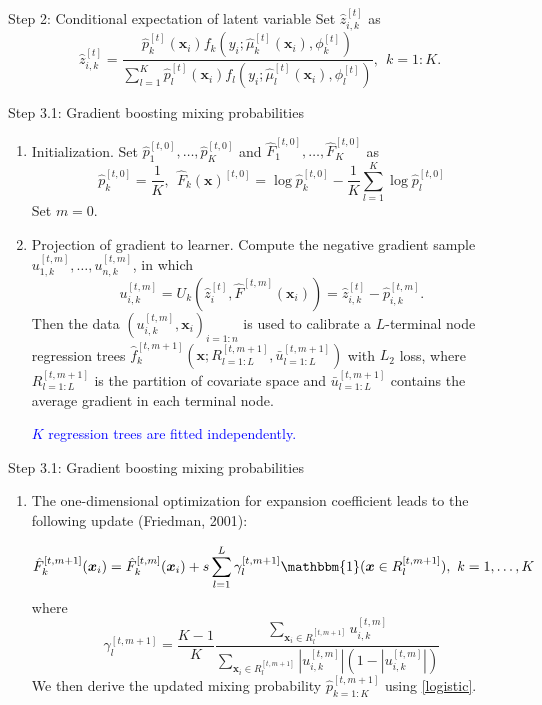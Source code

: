 \documentclass[professionalfont]{beamer}
\newcounter{saveenumi}
\newcommand{\seti}{\setcounter{saveenumi}{\value{enumi}}}
\newcommand{\conti}{\setcounter{enumi}{\value{saveenumi}}}
\def\bx{\boldsymbol{x}}
\newcommand{\blue}[1]{\textcolor{blue}{#1}}
\begin{document}
\begin{frame}{Step 2: Conditional expectation of latent variable}
	Set $\hat{z}_{i,k}^{[t]}$ as
	\begin{equation*}
		\hat{z}_{i,k}^{[t]}=\frac{\hat{p}_{k}^{[t]}(\bx_i) f_{k}\left(y_i ; \hat{\mu}_{k}^{[t]}(\bx_i), \phi_k^{[t]} \right)}{\sum_{l=1}^{K} \hat{p}_{l}^{[t]}(\bx_i) f_{l}\left(y_i ; \hat{\mu}_{l}^{[t]}(\bx_i), \phi_l^{[t]}\right)},~~ k=1:K.
	\end{equation*}
\end{frame}

\begin{frame}{Step 3.1: Gradient boosting mixing probabilities}
	\begin{enumerate}
		\item Initialization. Set $\hat{p}_1^{[t,0]}, \ldots, \hat{p}_K^{[t,0]}$ and $\hat{F}_1^{[t,0]}, \ldots, \hat{F}_{K}^{[t,0]}$ as
		$$\hat{p}_k^{[t,0]}=\frac{1}{K},
		~~\hat{F}_k(\bx)^{[t,0]}=\log \hat{p}_k^{[t,0]}-\frac{1}{K}\sum_{l=1}^K\log \hat{p}_l^{[t,0]}$$
	Set $m=0$.
		\item Projection of gradient to learner.
		Compute the negative gradient sample $u_{1,k}^{[t,m]},\ldots,u_{n,k}^{[t,m]}$,  in which
		$$u_{i,k}^{[t,m]}=U_k(\hat{z}_{i}^{[t]},\hat{F}^{[t,m]}(\bx_i))=\hat{z}_{i,k}^{[t]}-\hat{p}_{i,k}^{[t,m]}.$$
		Then the data $(u_{i,k}^{[t,m]},\bx_i)_{i=1:n}$ is used to calibrate a $L$-terminal node regression trees $\hat{f}_k^{[t,m+1]}\left(\bx;R^{[t,m+1]}_{l=1:L},\bar{u}^{[t,m+1]}_{l=1:L}\right)$ with $L_2$ loss,
		where $R^{[t,m+1]}_{l=1:L}$ is the partition of covariate space and $\bar{u}^{[t,m+1]}_{l=1:L}$ contains the average gradient in each terminal node.

		\blue{$K$ regression trees are fitted independently.}
		\seti
	\end{enumerate}
\end{frame}

\begin{frame}{Step 3.1: Gradient boosting mixing probabilities}
	\begin{enumerate}
		\conti
		\item  The one-dimensional optimization for expansion coefficient leads to the following update (Friedman, 2001):

		$$\hat{F}_k^{[t,m+1]}(\bx_i)=\hat{F}_k^{[t,m]}(\bx_i)+s\sum_{l=1}^L\gamma^{[t,m+1]}_l\mathbbm{1}(\bx\in R^{[t,m+1]}_l),~ k=1,\ldots,K$$
		where
		$$\gamma^{[t,m+1]}_l=\frac{K-1}{K}\frac{\sum_{\bx_i\in R_l^{[t,m+1]}}u_{i,k}^{[t,m]}}{\sum_{\bx_i\in R_l^{[t,m+1]}}|u_{i,k}^{[t,m]}|(1-|u_{i,k}^{[t,m]}|)}$$
		We then derive the updated mixing probability $\hat{p}^{[t,m+1]}_{k=1:K}$  using \eqref{logistic}.


		\seti
	\end{enumerate}
\end{frame}
\end{document}
